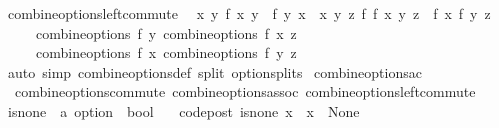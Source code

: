 \begin{isabellebody}
\endisatagproof
{\isafoldproof}%
%
\isadelimproof
\isanewline
%
\endisadelimproof
\isanewline
{}\isamarkupfalse%
\ combine{\isacharunderscore}{\kern0pt}options{\isacharunderscore}{\kern0pt}left{\isacharunderscore}{\kern0pt}commute{\isacharcolon}{\kern0pt}\isanewline
\ \ {\isachardoublequoteopen}{\isacharparenleft}{\kern0pt}{\isasymAnd}x\ y{\isachardot}{\kern0pt}\ f\ x\ y\ {\isacharequal}{\kern0pt}\ f\ y\ x{\isacharparenright}{\kern0pt}\ {\isasymLongrightarrow}\ {\isacharparenleft}{\kern0pt}{\isasymAnd}x\ y\ z{\isachardot}{\kern0pt}\ f\ {\isacharparenleft}{\kern0pt}f\ x\ y{\isacharparenright}{\kern0pt}\ z\ {\isacharequal}{\kern0pt}\ f\ x\ {\isacharparenleft}{\kern0pt}f\ y\ z{\isacharparenright}{\kern0pt}{\isacharparenright}{\kern0pt}\ {\isasymLongrightarrow}\ \isanewline
\ \ \ \ \ combine{\isacharunderscore}{\kern0pt}options\ f\ y\ {\isacharparenleft}{\kern0pt}combine{\isacharunderscore}{\kern0pt}options\ f\ x\ z{\isacharparenright}{\kern0pt}\ {\isacharequal}{\kern0pt}\isanewline
\ \ \ \ \ combine{\isacharunderscore}{\kern0pt}options\ f\ x\ {\isacharparenleft}{\kern0pt}combine{\isacharunderscore}{\kern0pt}options\ f\ y\ z{\isacharparenright}{\kern0pt}{\isachardoublequoteclose}\isanewline
%
\isadelimproof
\ \ %
\endisadelimproof
%
\isatagproof
{}\isamarkupfalse%
\ {\isacharparenleft}{\kern0pt}auto\ simp{\isacharcolon}{\kern0pt}\ combine{\isacharunderscore}{\kern0pt}options{\isacharunderscore}{\kern0pt}def\ split{\isacharcolon}{\kern0pt}\ option{\isachardot}{\kern0pt}splits{\isacharparenright}{\kern0pt}%
\endisatagproof
{\isafoldproof}%
%
\isadelimproof
\isanewline
%
\endisadelimproof
\isanewline
{}\isamarkupfalse%
\ combine{\isacharunderscore}{\kern0pt}options{\isacharunderscore}{\kern0pt}ac\ {\isacharequal}{\kern0pt}\ \isanewline
\ \ combine{\isacharunderscore}{\kern0pt}options{\isacharunderscore}{\kern0pt}commute\ combine{\isacharunderscore}{\kern0pt}options{\isacharunderscore}{\kern0pt}assoc\ combine{\isacharunderscore}{\kern0pt}options{\isacharunderscore}{\kern0pt}left{\isacharunderscore}{\kern0pt}commute\isanewline
\isanewline
\isanewline
{}\isamarkupfalse%
\isanewline
{}\isanewline
\isanewline
{}\ \isamarkupfalse%
\ is{\isacharunderscore}{\kern0pt}none\ {\isacharcolon}{\kern0pt}{\isacharcolon}{\kern0pt}\ {\isachardoublequoteopen}{\isacharprime}{\kern0pt}a\ option\ {\isasymRightarrow}\ bool{\isachardoublequoteclose}\isanewline
\ \ \ {\isacharbrackleft}{\kern0pt}code{\isacharunderscore}{\kern0pt}post{\isacharbrackright}{\kern0pt}{\isacharcolon}{\kern0pt}\ {\isachardoublequoteopen}is{\isacharunderscore}{\kern0pt}none\ x\ {\isasymlongleftrightarrow}\ x\ {\isacharequal}{\kern0pt}\ None{\isachardoublequoteclose}\isanewline

\end{isabellebody}
